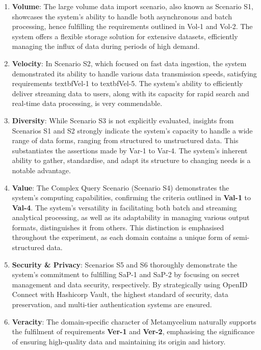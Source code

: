 \documentclass[preprint,12pt]{elsarticle}
\begin{document}
\begin{enumerate} 
  
  \item \textbf{Volume}: The large volume data import scenario, also known as Scenario S1, showcases the system's ability to handle both asynchronous and batch processing, hence fulfilling the requirements outlined in Vol-1 and Vol-2. The system offers a flexible storage solution for extensive datasets, efficiently managing the influx of data during periods of high demand.
    
    \item \textbf{Velocity}: In Scenario S2, which focused on fast data ingestion, the system demonstrated its ability to handle various data transmission speeds, satisfying requirements textbfVel-1 to textbfVel-5. The system's ability to efficiently deliver streaming data to users, along with its capacity for rapid search and real-time data processing, is very commendable.
    
    \item \textbf{Diversity}: While Scenario S3 is not explicitly evaluated, insights from Scenarios S1 and S2 strongly indicate the system's capacity to handle a wide range of data forms, ranging from structured to unstructured data. This substantiates the assertions made by Var-1 to Var-4. The system's inherent ability to gather, standardise, and adapt its structure to changing needs is a notable advantage.
    
    \item \textbf{Value}: The Complex Query Scenario (Scenario S4) demonstrates the system's computing capabilities, confirming the criteria outlined in \textbf{Val-1} to \textbf{Val-4}. The system's versatility in facilitating both batch and streaming analytical processing, as well as its adaptability in managing various output formats, distinguishes it from others. This distinction is emphasised throughout the experiment, as each domain contains a unique form of semi-structured data.
    
    \item \textbf{Security \& Privacy}: Scenarios S5 and S6 thoroughly demonstrate the system's commitment to fulfilling SaP-1 and SaP-2 by focusing on secret management and data security, respectively. By strategically using OpenID Connect with Hashicorp Vault, the highest standard of security, data preservation, and multi-tier authentication systems are ensured.
    
    \item \textbf{Veracity}: The domain-specific character of Metamycelium naturally supports the fulfilment of requirements \textbf{Ver-1} and \textbf{Ver-2}, emphasising the significance of ensuring high-quality data and maintaining its origin and history.
  
\end{enumerate}
\end{document}
